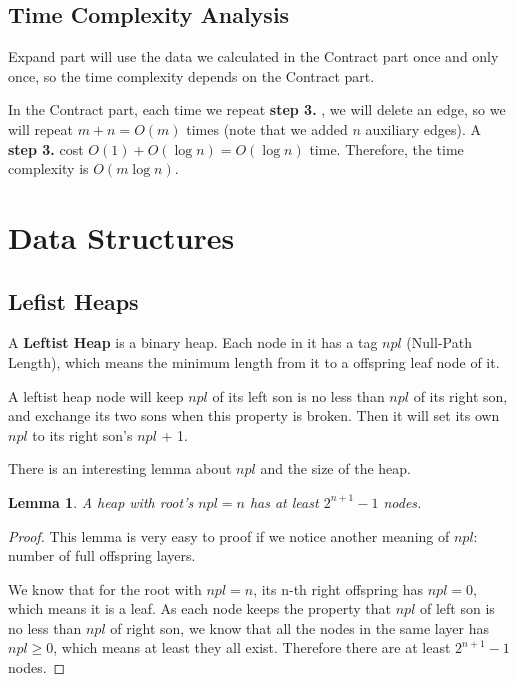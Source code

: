 \documentclass{article}
\newtheorem{lemma}{Lemma}
\begin{document}
\subsection{Time Complexity Analysis}

Expand part will use the data we calculated in the Contract part once and only once, so the time complexity depends on the Contract part.

In the Contract part, each time we repeat \textbf{step 3.} , we will delete an edge, so we will repeat $m+n=O(m)$ times (note that we added $n$ auxiliary edges). A \textbf{step 3.} cost $O(1)+O(\log n)=O(\log n)$ time. Therefore, the time complexity is $O(m\log n)$.

\section{Data Structures}

\subsection{Lefist Heaps}

A \textbf{Leftist Heap} is a binary heap. Each node in it has a tag $npl$ (Null-Path Length), which means the minimum length from it to a offspring leaf node of it.

A leftist heap node will keep $npl$ of its left son is no less than $npl$ of its right son, and exchange its two sons when this property is broken. Then it will set its own $npl$ to its right son's $npl$ + 1.

There is an interesting lemma about $npl$ and the size of the heap.

\begin{lemma}
    A heap with root's $npl=n$ has at least $2^{n+1}-1$ nodes.
\end{lemma}

\begin{proof}
    This lemma is very easy to proof if we notice another meaning of $npl$: number of full offspring layers.
    
    We know that for the root with $npl=n$, its n-th right offspring has $npl=0$, which means it is a leaf. As each node keeps the property that $npl$ of left son is no less than $npl$ of right son, we know that all the nodes in the same layer has $npl\ge0$, which means at least they all exist. Therefore there are at least $2^{n+1}-1$ nodes.
\end{proof}
\end{document}
